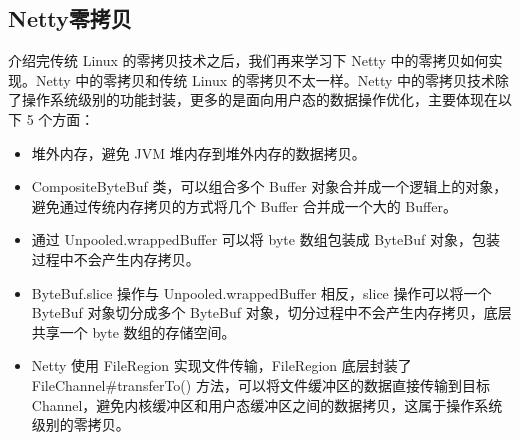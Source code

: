 \documentclass[../../../interview-questions.tex]{subfiles}
\begin{document}
\subsection{Netty零拷贝}

介绍完传统 Linux 的零拷贝技术之后，我们再来学习下 Netty 中的零拷贝如何实现。Netty 中的零拷贝和传统 Linux 的零拷贝不太一样。Netty 中的零拷贝技术除了操作系统级别的功能封装，更多的是面向用户态的数据操作优化，主要体现在以下 5 个方面：

\begin{itemize}
    \item {堆外内存，避免 JVM 堆内存到堆外内存的数据拷贝。}
    \item {CompositeByteBuf 类，可以组合多个 Buffer 对象合并成一个逻辑上的对象，避免通过传统内存拷贝的方式将几个 Buffer 合并成一个大的 Buffer。}
    \item {通过 Unpooled.wrappedBuffer 可以将 byte 数组包装成 ByteBuf 对象，包装过程中不会产生内存拷贝。}
    \item {ByteBuf.slice 操作与 Unpooled.wrappedBuffer 相反，slice 操作可以将一个 ByteBuf 对象切分成多个 ByteBuf 对象，切分过程中不会产生内存拷贝，底层共享一个 byte 数组的存储空间。}
    \item {Netty 使用 FileRegion 实现文件传输，FileRegion 底层封装了 FileChannel\#transferTo() 方法，可以将文件缓冲区的数据直接传输到目标 Channel，避免内核缓冲区和用户态缓冲区之间的数据拷贝，这属于操作系统级别的零拷贝。}
\end{itemize}
\end{document}

